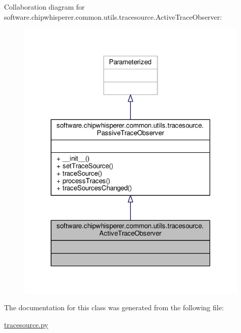 Collaboration diagram for software.\+chipwhisperer.\+common.\+utils.\+tracesource.\+Active\+Trace\+Observer\+:\nopagebreak
\begin{figure}[H]
\begin{center}
\leavevmode
\includegraphics[width=316pt]{d5/dad/classsoftware_1_1chipwhisperer_1_1common_1_1utils_1_1tracesource_1_1ActiveTraceObserver__coll__graph}
\end{center}
\end{figure}


The documentation for this class was generated from the following file\+:\begin{DoxyCompactItemize}
\item 
\hyperlink{tracesource_8py}{tracesource.\+py}\end{DoxyCompactItemize}
